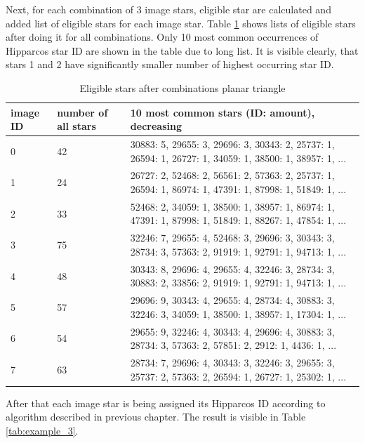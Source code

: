 \documentclass[12pt,a4paper,twoside]{article}
\begin{document}
Next, for each combination of 3 image stars, eligible star are calculated and added list of eligible stars for each image star. Table \ref{tab:example_2} shows lists of eligible stars after doing it for all combinations. 
Only 10 most common occurrences of Hipparcos star ID are shown in the table due to long list. It is visible clearly, that stars 1 and 2 have significantly smaller number of highest occurring star ID.

\renewcommand{\arraystretch}{1.5}
\begin{table}[!htbp]
\centering
\begin{tabular}{|p{1.5cm}|p{1.5cm}|p{7cm}|}
\hline 
image ID & number of all stars & 10 most common stars (ID: amount), decreasing\\ 
\hline 
0 & 42 &  30883: 5, 29655: 3, 29696: 3, 30343: 2, 25737: 1, 26594: 1, 26727: 1, 34059: 1, 38500: 1, 38957: 1, ... \\
\hline 
1 & 24 &  26727: 2, 52468: 2, 56561: 2, 57363: 2, 25737: 1, 26594: 1, 86974: 1, 47391: 1, 87998: 1, 51849: 1, ... \\
\hline 
2 & 33 &  52468: 2, 34059: 1, 38500: 1, 38957: 1, 86974: 1, 47391: 1, 87998: 1, 51849: 1, 88267: 1, 47854: 1, ... \\
\hline 
3 & 75 &  32246: 7, 29655: 4, 52468: 3, 29696: 3, 30343: 3, 28734: 3, 57363: 2, 91919: 1, 92791: 1, 94713: 1, ... \\
\hline 
4 & 48 &  30343: 8, 29696: 4, 29655: 4, 32246: 3, 28734: 3, 30883: 2, 33856: 2, 91919: 1, 92791: 1, 94713: 1, ... \\
\hline 
5 & 57 &  29696: 9, 30343: 4, 29655: 4, 28734: 4, 30883: 3, 32246: 3, 34059: 1, 38500: 1, 38957: 1, 17304: 1, ... \\
\hline 
6 & 54 &  29655: 9, 32246: 4, 30343: 4, 29696: 4, 30883: 3, 28734: 3, 57363: 2, 57851: 2, 2912: 1, 4436: 1, ... \\
\hline 
7 & 63 &  28734: 7, 29696: 4, 30343: 3, 32246: 3, 29655: 3, 25737: 2, 57363: 2, 26594: 1, 26727: 1, 25302: 1, ... \\
\hline 
\end{tabular}
\caption{Eligible stars after combinations planar triangle}
\label{tab:example_2}
\end{table}

After that each image star is being assigned its Hipparcos ID according to algorithm described in previous chapter. 
The result is visible in Table \ref{tab:example_3}.
\end{document}
